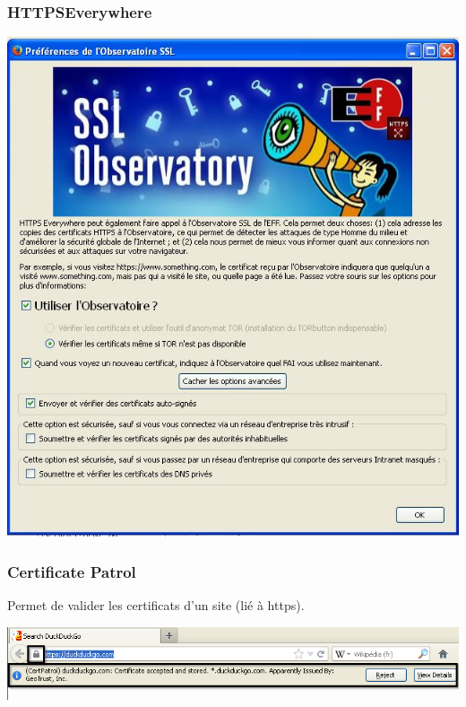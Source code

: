 \documentclass{beamer}
\begin{document}
\begin{frame}
\frametitle{HTTPSEverywhere}

\begin{center}
\includegraphics[scale=0.4] {./images/Https_SSL_Observatory.jpg}
\end{center}

\end{frame}

\begin{frame}
\frametitle{Certificate Patrol}
Permet de valider les certificats d'un site (lié à https).
\begin{center}
\includegraphics[scale=0.5] {./images/CertificatePatrol.png}
\end{center}
\end{frame}
\end{document}
